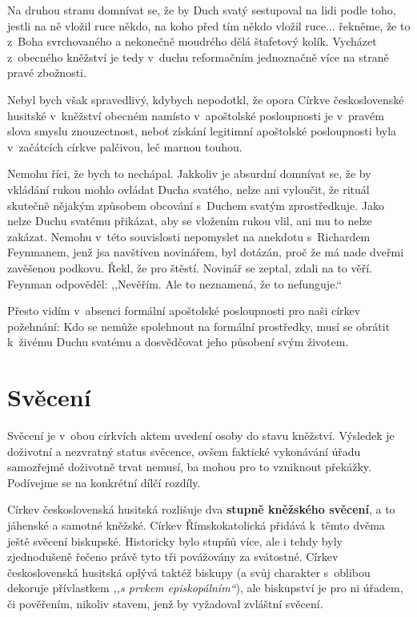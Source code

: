 Na druhou stranu domnívat se, že by Duch svatý sestupoval na lidi podle toho,
jestli na ně vložil ruce někdo, na koho před tím někdo vložil ruce... řekněme,
že to z~Boha svrchovaného a nekonečně moudrého dělá štafetový kolík. Vycházet
z~obecného kněžství je tedy v~duchu reformačním jednoznačně více na straně pravé
zbožnosti.

Nebyl bych však spravedlivý, kdybych nepodotkl, že opora Církve československé
husitské v~kněžství obecném namísto v~apoštolské posloupnosti je v~pravém slova
smyslu znouzectnost, neboť získání legitimní apoštolské posloupnosti
byla v~začátcích církve palčivou, leč marnou touhou.

Nemohu říci, že bych to nechápal. Jakkoliv je absurdní domnívat se, že by
vkládání rukou mohlo ovládat Ducha svatého, nelze ani vyloučit, že rituál
skutečně nějakým způsobem obcování s~Duchem svatým zprostředkuje. Jako nelze
Duchu svatému přikázat, aby se vložením rukou vlil, ani mu to nelze zakázat.
Nemohu v~této souvislosti nepomyslet na anekdotu s~Richardem Feynmanem, jenž jsa
navštíven novinářem, byl dotázán, proč že má nade dveřmi zavěšenou podkovu.
Řekl, že pro štěstí. Novinář se zeptal, zdali na to věří. Feynman odpověděl:
,,Nevěřím. Ale to neznamená, že to nefunguje.``

Přesto vidím v~absenci formální apoštolské posloupnosti pro naši církev
požehnání: Kdo se nemůže spolehnout na formální prostředky, musí se obrátit
k~živému Duchu svatému a dosvědčovat jeho působení svým životem.

\chapter{Svěcení}

Svěcení je v~obou církvích aktem uvedení osoby do stavu kněžství. Výsledek je
doživotní a nezvratný status svěcence, ovšem faktické vykonávání úřadu
samozřejmě doživotně trvat nemusí, ba mohou pro to vzniknout překážky.
Podívejme se na konkrétní dílčí rozdíly.

Církev československá husitská rozlišuje dva \textbf{stupně kněžského svěcení},
a to jáhenské a samotné kněžské. Církev Římskokatolická přidává k~těmto dvěma
ještě svěcení biskupské. Historicky bylo stupňů více, ale i tehdy byly
zjednodušeně řečeno právě tyto tři povážovány za svátostné. Církev
československá husitská oplývá taktéž biskupy (a svůj charakter s~oblibou
dekoruje přívlastkem \textit{,,s prvkem episkopálním``}), ale biskupství je pro
ni úřadem, či pověřením, nikoliv stavem, jenž by vyžadoval zvláštní svěcení.

